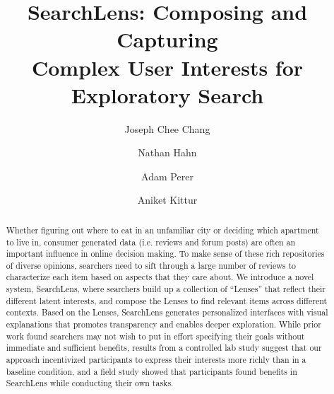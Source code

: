 \documentclass[sigconf]{acmart}
\begin{document}
\title{SearchLens: Composing and Capturing\\Complex User Interests for Exploratory Search}


\author{Joseph Chee Chang}

\author{Nathan Hahn}

\author{Adam Perer}

\author{Aniket Kittur}



\begin{abstract}
Whether figuring out where to eat in an unfamiliar city or deciding which apartment to live in, consumer generated data (i.e. reviews and forum posts) are often an important influence in online decision making. To make sense of these rich repositories of diverse opinions, searchers need to sift through a large number of reviews to characterize each item based on aspects that they care about. We introduce a novel system, SearchLens, where searchers build up a collection of ``Lenses'' that reflect their different latent interests, and compose the Lenses to find relevant items across different contexts. Based on the Lenses, SearchLens generates personalized interfaces with visual explanations that promotes transparency and enables deeper exploration. While prior work  found searchers may not wish to put in effort specifying their goals without immediate and sufficient benefits, results from a controlled lab study suggest that our approach incentivized participants to express their interests more richly than in a baseline condition, and a field study showed that participants found benefits in SearchLens while conducting their own tasks.
\end{abstract}
\end{document}

